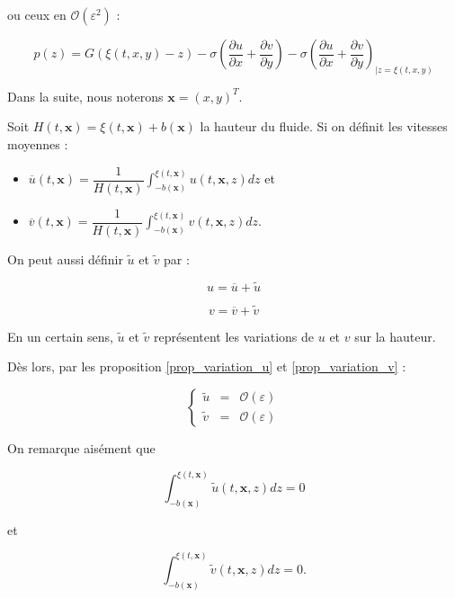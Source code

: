 \documentclass[10pt,a4paper]{amsart}
\def\gint{\displaystyle\int}
\begin{document}
ou ceux en $\mathcal{O} \left( \varepsilon^2 \right)$ :

\begin{equation}\label{hyp_hydrostatique_ordre2}
p(z) = G(\xi(t,x,y) - z ) - \sigma \left( \dfrac{\partial u}{\partial x} + \dfrac{\partial v}{\partial y} \right) - \sigma \left( \dfrac{\partial u}{\partial x} + \dfrac{\partial v}{\partial y} \right)_{| z=\xi(t,x,y)}
\end{equation}


Dans la suite, nous noterons $\textbf{x} = (x,y)^T$.

Soit $H(t,\textbf{x}) = \xi(t, \textbf{x}) + b(\textbf{x}) $ la hauteur du fluide. Si on définit les vitesses moyennes :

\begin{itemize}
\item $\overline{u}(t,\textbf{x}) = \dfrac{1}{H(t,\textbf{x})}\gint_{-b(\textbf{x})}^{\xi(t,\textbf{x})} u(t,\textbf{x},z) dz$ et

\item $\overline{v}(t,\textbf{x}) = \dfrac{1}{H(t,\textbf{x})}\gint_{-b(\textbf{x})}^{\xi(t,\textbf{x})} v(t,\textbf{x},z) dz$. 
\end{itemize}

On peut aussi définir $\widetilde{u}$ et $\widetilde{v}$ par :

$$u = \overline{u} + \widetilde{u}$$

$$v = \overline{v} + \widetilde{v}$$

En un certain sens, $\widetilde{u}$ et $\widetilde{v}$ représentent les variations de $u$ et $v$ sur la hauteur.

Dès lors, par les proposition \ref{prop_variation_u} et \ref{prop_variation_v} :

\begin{equation} \label{variations_faibles}
\left\{
\begin{array}{rcl}
\widetilde{u} & = & \mathcal{O}\left( \varepsilon \right) \\
\widetilde{v} & = & \mathcal{O}\left( \varepsilon \right) 
\end{array}
\right.
\end{equation}

On remarque aisément que

$$\gint_{-b(\textbf{x})}^{\xi(t,\textbf{x})} \widetilde{u}(t,\textbf{x},z) dz = 0$$

et

$$\gint_{-b(\textbf{x})}^{\xi(t,\textbf{x})} \widetilde{v}(t,\textbf{x},z) dz = 0.$$
\end{document}
